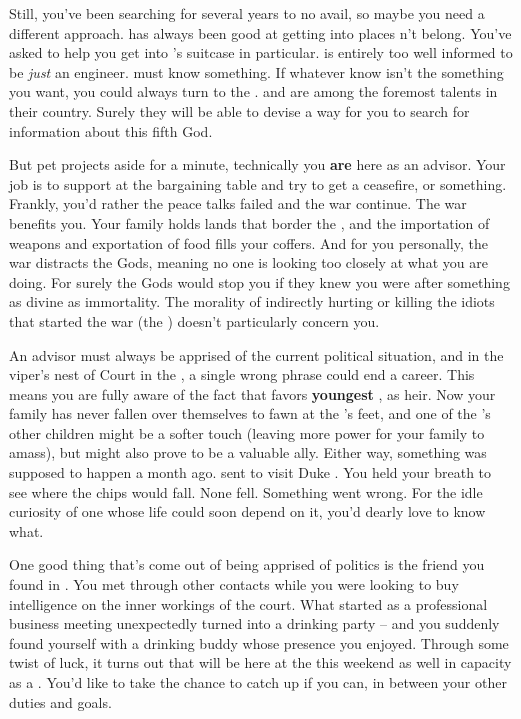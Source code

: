 \documentclass[char]{GL2020}
\begin{document}
Still, you’ve been searching for several years to no avail, so maybe you need a different approach. \cDisney{} has always been good at getting into places  \cDisney{\does}n’t belong. You’ve asked \cDisney{\them} to help you get into \cBunker{}’s suitcase in particular. \cBunker{} is entirely too well informed to be \emph{just} an engineer. \cBunker{\They} must know something. If whatever \cBunker{\they} know\cBunker{\plural} isn’t the something you want, you could always turn to the \pTech{}. \cHeadScientist{} and \cAssistantScientist{} are among the foremost talents in their country. Surely they will be able to devise a way for you to search for information about this fifth God.

But pet projects aside for a minute, technically you \textbf{are} here as an advisor. Your job is to support \cEvil{} at the bargaining table and try to get a ceasefire, or something. Frankly, you’d rather the peace talks failed and the war continue. The war benefits you. Your family holds lands that border the \pTech{}, and the importation of weapons and exportation of food fills your coffers. And for you personally, the war distracts the Gods, meaning no one is looking too closely at what you are doing. For surely the Gods would stop you if they knew you were after something as divine as immortality. The morality of indirectly hurting or killing the idiots that started the war (the \pShip{}) doesn’t particularly concern you.

An advisor must always be apprised of the current political situation, and in the viper's nest of Court in the \pFarm{}, a single wrong phrase could end a career. This means you are fully aware of the fact that \cQueen{\Majesty} \cQueen{} favors \cQueen{\their} \textbf{youngest} \cPrince{\child}, \cPrince{} as \cQueen{\their} heir. Now your family has never fallen over themselves to fawn at the \cQueen{\Majesty}’s feet, and one of the \cQueen{\Majesty}’s other children might be a softer touch (leaving more power for your family to amass), but \cPrince{} might also prove to be a valuable ally. Either way, something was supposed to happen a month ago. \cQueen{\Majesty} \cQueen{} sent \cPrince{} to visit Duke \cChupStudent{\formal}. You held your breath to see where the chips would fall. None fell. Something went wrong. For the idle curiosity of one whose life could soon depend on it, you’d dearly love to know what.

One good thing that’s come out of being apprised of politics is the friend you found in \cHedonist{}. You met \cHedonist{} through other contacts while you were looking to buy intelligence on the inner workings of the court. What started as a professional business meeting unexpectedly turned into a drinking party -- and you suddenly found yourself with a drinking buddy whose presence you enjoyed. Through some twist of luck, it turns out that \cHedonist{} will be here at the \pSc{} this weekend as well in \cHedonist{\their} capacity as a \cHedonist{\cleric}. You’d like to take the chance to catch up if you can, in between your other duties and goals.
\end{document}
